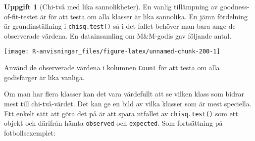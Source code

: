 \documentclass[
]{book}
\newenvironment{Shaded}{\begin{snugshade}}{\end{snugshade}}
\newcommand{\AttributeTok}[1]{\textcolor[rgb]{0.13,0.29,0.53}{#1}}
\newcommand{\DecValTok}[1]{\textcolor[rgb]{0.00,0.00,0.81}{#1}}
\newcommand{\FloatTok}[1]{\textcolor[rgb]{0.00,0.00,0.81}{#1}}
\newcommand{\FunctionTok}[1]{\textcolor[rgb]{0.13,0.29,0.53}{\textbf{#1}}}
\newcommand{\NormalTok}[1]{#1}
\newcommand{\OtherTok}[1]{\textcolor[rgb]{0.56,0.35,0.01}{#1}}
\newcommand{\SpecialCharTok}[1]{\textcolor[rgb]{0.81,0.36,0.00}{\textbf{#1}}}
\newcommand{\StringTok}[1]{\textcolor[rgb]{0.31,0.60,0.02}{#1}}
\theoremstyle{definition}
\theoremstyle{definition}
\theoremstyle{definition}
\newtheorem{exercise}{Uppgift}[chapter]
\theoremstyle{definition}
\theoremstyle{remark}
\begin{document}
\begin{exercise}[Chi-två med lika sannolikheter]
En vanlig tillämpning av goodness-of-fit-testet är för att testa om alla klasser är lika sannolika. En jämn fördelning är grundinställning i \texttt{chisq.test()} så i det fallet behöver man bara ange de observerade värdena. En datainsamling om M\&M-godis gav följande antal.

\begin{Shaded}
\end{Shaded}

\begin{center}\texttt{[image: R-anvisningar\_files/figure-latex/unnamed-chunk-200-1]} \end{center}

Använd de observerade värdena i kolumnen \texttt{Count} för att testa om alla godisfärger är lika vanliga.
\end{exercise}

Om man har flera klasser kan det vara värdefullt att se vilken klass som bidrar mest till chi-två-värdet. Det kan ge en bild av vilka klasser som är mest speciella. Ett enkelt sätt att göra det på är att spara utfallet av \texttt{chisq.test()} som ett objekt och därifrån hämta \texttt{observed} och \texttt{expected}. Som fortsättning på fotbollsexemplet:

\begin{Shaded}
\end{Shaded}
\end{document}
